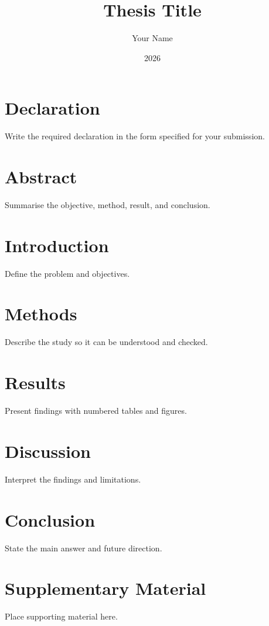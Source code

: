 \documentclass[11pt,oneside]{report}
\title{Thesis Title}
\author{Your Name}
\date{2026}
\begin{document}
\maketitle

\chapter*{Declaration}
Write the required declaration in the form specified for your submission.

\chapter*{Abstract}
Summarise the objective, method, result, and conclusion.

\tableofcontents
\clearpage
{}

\chapter{Introduction}
Define the problem and objectives.

\chapter{Methods}
Describe the study so it can be understood and checked.

\chapter{Results}
Present findings with numbered tables and figures.

\chapter{Discussion}
Interpret the findings and limitations.

\chapter{Conclusion}
State the main answer and future direction.

\appendix
\chapter{Supplementary Material}
Place supporting material here.
\end{document}
